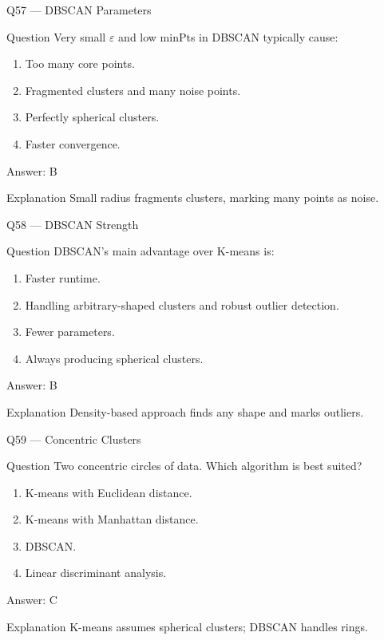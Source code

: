 \documentclass[aspectratio=169,8pt]{beamer}
\begin{document}
	\begin{frame}{Q57 --- DBSCAN Parameters}
		\begin{block}{Question}
			Very small $\varepsilon$ and low minPts in DBSCAN typically cause:
		\end{block}
		\begin{enumerate}
			\item Too many core points.
			\item Fragmented clusters and many noise points.
			\item Perfectly spherical clusters.
			\item Faster convergence.
		\end{enumerate}
		\begin{exampleblock}{Answer: B}\end{exampleblock}
		\begin{block}{Explanation}
			Small radius fragments clusters, marking many points as noise.
		\end{block}
	\end{frame}
	
	\begin{frame}{Q58 --- DBSCAN Strength}
		\begin{block}{Question}
			DBSCAN's main advantage over K-means is:
		\end{block}
		\begin{enumerate}
			\item Faster runtime.
			\item Handling arbitrary-shaped clusters and robust outlier detection.
			\item Fewer parameters.
			\item Always producing spherical clusters.
		\end{enumerate}
		\begin{exampleblock}{Answer: B}\end{exampleblock}
		\begin{block}{Explanation}
			Density-based approach finds any shape and marks outliers.
		\end{block}
	\end{frame}
	
	\begin{frame}{Q59 --- Concentric Clusters}
		\begin{block}{Question}
			Two concentric circles of data. Which algorithm is best suited?
		\end{block}
		\begin{enumerate}
			\item K-means with Euclidean distance.
			\item K-means with Manhattan distance.
			\item DBSCAN.
			\item Linear discriminant analysis.
		\end{enumerate}
		\begin{exampleblock}{Answer: C}\end{exampleblock}
		\begin{block}{Explanation}
			K-means assumes spherical clusters; DBSCAN handles rings.
		\end{block}
	\end{frame}
	
\end{document}
